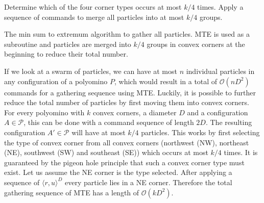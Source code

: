 \begin{algorithm}[ht]
    
    Determine which of the four corner types occurs at most $k/4$ times. \;
    Apply a sequence of commands to merge all particles into at most $k/4$ groups.


    
    \caption[The Min Sum To Extremum algorithm]{The min sum to extremum algorithm to gather all particles. MTE is used as a subroutine and particles are merged into $k/4$ groups in convex corners at the beginning to reduce their total number.}\label{alg:MSTE}
\end{algorithm}

If we look at a swarm of particles, we can have at most $n$ individual particles in any configuration of a polyomino $P$, which would result in a total of $\mathcal{O}(nD^2)$ commands for a gathering sequence using MTE. Luckily, it is possible to further reduce the total number of particles by first moving them into convex corners. For every polyomino with $k$ convex corners, a diameter $D$ and a configuration $A \in \mathcal{P}$, this can be done with a command sequence of length $2D$. The resulting configuration $A' \in \mathcal{P}$ will have at most $k/4$ particles. This works by first selecting the type of convex corner from all convex corners (northwest (NW), northeast (NE), southwest (SW) and southeast (SE)) which occurs at most $k/4$ times. It is guaranteed by the pigeon hole principle that such a convex corner type must exist. Let us assume the NE corner is the type selected. After applying a sequence of $\langle r, u \rangle^D$ every particle lies in a NE corner. Therefore the total gathering sequence of MTE has a length of $\mathcal{O}(kD^2)$. 

